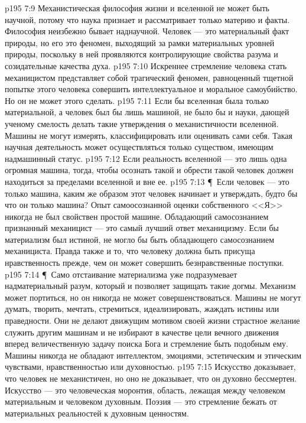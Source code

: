 \vs p195 7:9 Механистическая философия жизни и вселенной не может быть научной, потому что наука признает и рассматривает только материю и факты. Философия неизбежно бывает наднаучной. Человек --- это материальный факт природы, но его  это феномен, выходящий за рамки материальных уровней природы, поскольку в ней проявляются контролирующие свойства разума и созидательные качества духа.
\vs p195 7:10 Искреннее стремление человека стать механицистом представляет собой трагический феномен, равноценный тщетной попытке этого человека совершить интеллектуальное и моральное самоубийство. Но он не может этого сделать.
\vs p195 7:11 Если бы вселенная была только материальной, а человек был бы лишь машиной, не было бы и науки, дающей ученому смелость делать такие утверждения о механистичности вселенной. Машины не могут измерять, классифицировать или оценивать сами себя. Такая научная деятельность может осуществляться только существом, имеющим надмашинный статус.
\vs p195 7:12 Если реальность вселенной --- это лишь одна огромная машина, тогда, чтобы осознать такой  и обрести  такой  человек должен находиться за пределами вселенной и вне ее.
\vs p195 7:13 \P\ Если человек --- это только машина, каким же образом этот человек начинает  и утверждать, будто бы  что он только машина? Опыт самоосознанной оценки собственного <<Я>> никогда не был свойствен простой машине. Обладающий самосознанием признанный механицист --- это самый лучший ответ механицизму. Если бы материализм был истиной, не могло бы быть обладающего самосознанием механициста. Правда также и то, что человеку должна быть присуща нравственность прежде, чем он может совершить безнравственные поступки.
\vs p195 7:14 \P\ Само отстаивание материализма уже подразумевает надматериальный разум, который и позволяет защищать такие догмы. Механизм может портиться, но он никогда не может совершенствоваться. Машины не могут думать, творить, мечтать, стремиться, идеализировать, жаждать истины или праведности. Они не делают движущим мотивом своей жизни страстное желание служить другим машинам и не избирают в качестве цели вечного движения вперед величественную задачу поиска Бога и стремление быть подобным ему. Машины никогда не обладают интеллектом, эмоциями, эстетическим и этическим чувствами, нравственностью или духовностью.
\vs p195 7:15 Искусство доказывает, что человек не механистичен, но оно не доказывает, что он духовно бессмертен. Искусство --- это человеческая моронтия, область, лежащая между человеком материальным и человеком духовным. Поэзия --- это стремление бежать от материальных реальностей к духовным ценностям.
